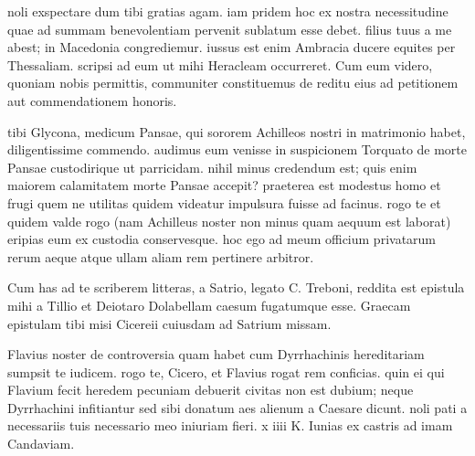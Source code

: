 


 noli exspectare dum tibi gratias agam. iam pridem hoc ex nostra necessitudine quae ad summam benevolentiam pervenit sublatum esse debet. filius tuus a me abest; in Macedonia congrediemur. iussus est enim Ambracia ducere equites per Thessaliam. scripsi ad eum ut mihi Heracleam occurreret. Cum eum videro, quoniam nobis permittis, communiter constituemus de reditu eius ad petitionem aut commendationem honoris.

 tibi Glycona, medicum Pansae, qui sororem Achilleos nostri in matrimonio habet, diligentissime commendo. audimus eum venisse in suspicionem Torquato de morte Pansae custodirique ut parricidam. nihil minus credendum est; quis enim maiorem calamitatem morte Pansae accepit? praeterea est modestus homo et frugi quem ne utilitas quidem videatur impulsura fuisse ad facinus. rogo te et quidem valde rogo (nam Achilleus noster non minus quam aequum est laborat) eripias eum ex custodia conservesque. hoc ego ad meum officium privatarum rerum aeque atque ullam aliam rem pertinere arbitror.

 Cum has ad te scriberem litteras, a Satrio, legato C. Treboni, reddita est epistula mihi a Tillio et Deiotaro Dolabellam caesum fugatumque esse. Graecam epistulam tibi misi Cicereii cuiusdam ad Satrium missam.

 Flavius noster de controversia quam habet cum Dyrrhachinis hereditariam sumpsit te iudicem. rogo te, Cicero, et Flavius rogat rem conficias. quin ei qui Flavium fecit heredem pecuniam debuerit civitas non est dubium; neque Dyrrhachini infitiantur sed sibi donatum aes alienum a Caesare dicunt. noli pati a necessariis tuis necessario meo iniuriam fieri. x iiii K. Iunias ex castris ad imam Candaviam.
